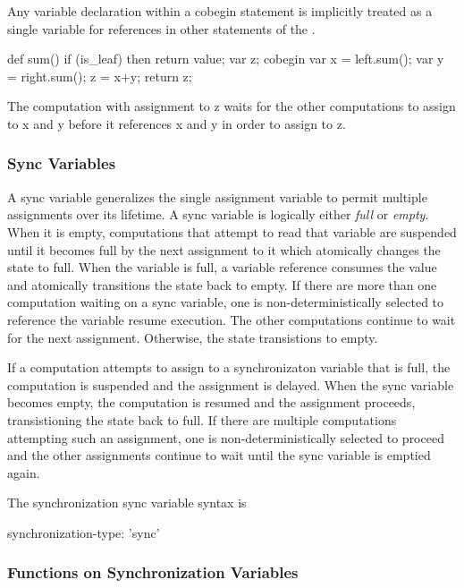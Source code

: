 Any variable declaration within a cobegin statement is implicitly treated as
a single variable for references in other statements of the
.  
\begin{example}
\begin{chapel}
def sum() {
  if (is_leaf) then 
    return value;
  var z;
  cobegin {
    var x = left.sum();
    var y = right.sum();
    z = x+y;
  }
  return z;
}
\end{chapel}
The computation with assignment to z waits for the other computations 
to assign to x and y before it references x and y in order to assign to z.
\end{example}


\subsubsection{Sync Variables}
\label{Sync_Variables}

A sync variable generalizes the single assignment variable to permit
multiple assignments over its lifetime. A sync variable is logically
either {\em full} or {\em empty}. When it is empty, computations that
attempt to read that variable are suspended until it becomes full by
the next assignment to it which atomically changes the state to
full. When the variable is full, a variable reference consumes the
value and atomically transitions the state back to empty. If there are
more than one computation waiting on a sync variable, one is
non-deterministically selected to reference the variable resume
execution.  The other computations continue to wait for the next
assignment. Otherwise, the state transistions to empty.

If a computation attempts to assign to a synchronizaton variable that is
full, the computation is suspended and the assignment is delayed. When
the sync variable becomes empty, the computation is resumed and the
assignment proceeds, transistioning the state back to full. If there
are multiple computations attempting such an assignment, one is
non-deterministically selected to proceed and the other assignments
continue to wait until the sync variable is emptied again.

The synchronization sync variable syntax is
\begin{syntax}
synchronization-type:
  'sync'
\end{syntax}

\subsubsection{Functions on Synchronization Variables}
\label{Functions_on_Synchronization_Variables}

